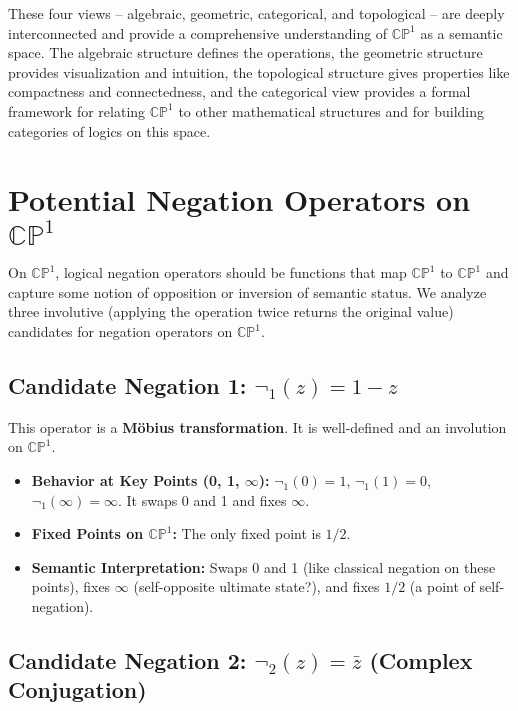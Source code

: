 	These four views -- algebraic, geometric, categorical, and topological -- are deeply interconnected and provide a comprehensive understanding of $\mathbb{CP}^1$ as a semantic space. The algebraic structure defines the operations, the geometric structure provides visualization and intuition, the topological structure gives properties like compactness and connectedness, and the categorical view provides a formal framework for relating $\mathbb{CP}^1$ to other mathematical structures and for building categories of logics on this space.
	
	\section{Potential Negation Operators on $\mathbb{CP}^1$}
	
	On $\mathbb{CP}^1$, logical negation operators should be functions that map $\mathbb{CP}^1$ to $\mathbb{CP}^1$ and capture some notion of opposition or inversion of semantic status. We analyze three involutive (applying the operation twice returns the original value) candidates for negation operators on $\mathbb{CP}^1$.
	
	\subsection{Candidate Negation 1: $\neg_1(z) = 1 - z$}
	
	This operator is a \textbf{M\"{o}bius transformation}. It is well-defined and an involution on $\mathbb{CP}^1$.
	
	\begin{itemize}
		\item \textbf{Behavior at Key Points (0, 1, $\infty$):} $\neg_1(0) = 1$, $\neg_1(1) = 0$, $\neg_1(\infty) = \infty$. It swaps 0 and 1 and fixes $\infty$.
		
		\item \textbf{Fixed Points on $\mathbb{CP}^1$:} The only fixed point is $1/2$.
		
		\item \textbf{Semantic Interpretation:} Swaps 0 and 1 (like classical negation on these points), fixes $\infty$ (self-opposite ultimate state?), and fixes $1/2$ (a point of self-negation).
	\end{itemize}
	
	\subsection{Candidate Negation 2: $\neg_2(z) = \bar{z}$ (Complex Conjugation)}
	
